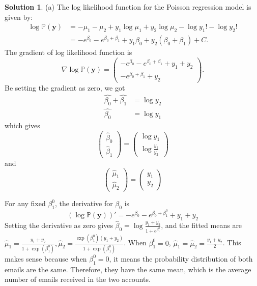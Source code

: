 \documentclass[11pt,letterpaper,english,oneside]{article} %
\theoremstyle{definition} %
\newtheorem{solution}{Solution}
\newenvironment{sol}{\begin{solution}\hspace{0pt}}{\end{solution}}
\begin{document}
\begin{sol}
	(a)
	The log likelihood function for the Poisson regression model is given by:
	\begin{align}
	\log\mathbb{P}(\bm{y})&=-\mu_1-\mu_2+y_1\log\mu_1+y_2\log\mu_2-\log y_1!-\log y_2!\\
	&=-e^{\beta_0}-e^{\beta_0+\beta_1}+y_1\beta_0+y_2(\beta_0+\beta_1)+C.
	\end{align}
The gradient of log likelihood function is
\begin{equation}
	\nabla\log\mathbb{P}(\bm{y})=\begin{pmatrix}
		-e^{\beta_0}-e^{\beta_0+\beta_1}+y_1+y_2\\
		-e^{\beta_0+\beta_1}+y_2
	\end{pmatrix}.
\end{equation}
Be setting the gradient as zero, we got
\begin{align}
\hat{\beta_0}+\hat{\beta_1}&=\log y_2\\
\hat{\beta_0}&=\log y_1
\end{align}
which gives
\begin{equation}
	\begin{pmatrix}
		\hat{\beta}_0\\
		\hat{\beta}_1
	\end{pmatrix}=
	\begin{pmatrix}
		\log y_1\\
		\log \frac{y_1}{y_2}
	\end{pmatrix}
\end{equation}
and
\begin{equation}
	\begin{pmatrix}
		\hat{\mu}_1\\
		\hat{\mu}_2
	\end{pmatrix}=
	\begin{pmatrix}
		y_1\\
		y_2
	\end{pmatrix}
\end{equation}

For any fixed $\beta_1^0$,  the derivative for $\beta_0$ is
\begin{equation}
		(\log\mathbb{P}(\bm{y}))'=-e^{\beta_0}-e^{\beta_0+\beta_1^0}+y_1+y_2
\end{equation}
Setting the derivative as zero gives $\hat{\beta}_0=\log\frac{y_1+y_2}{1+e^{\beta_1^0}}$, and the fitted means are
$\hat{\mu}_1=\frac{y_1+y_2}{1+\exp(\beta_1^0)},\hat{\mu}_2=\frac{\exp(\beta_1^0)(y_1+y_2)}{1+\exp(\beta_1^0)}$. When $\beta_1^0=0$, $\hat{\mu}_1=\hat{\mu}_2=\frac{y_1+y_2}{2}$. This makes sense because when $\beta_1^0=0$, it means the probability distribution of both emails are the same. Therefore, they have the same mean, which is the average number of emails received in the two accounts.


\end{sol}
\end{document}

